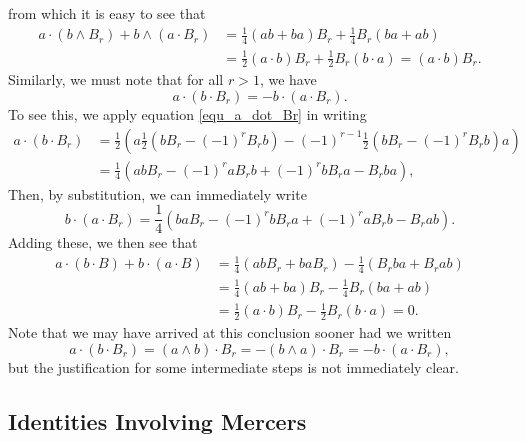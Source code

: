 \documentclass{birkjour}
\theoremstyle{definition}
\theoremstyle{remark}
\numberwithin{equation}{section}
\begin{document}
from which it is easy to see that
\begin{align*}
a\cdot(b\wedge B_r)+b\wedge(a\cdot B_r) &= \frac{1}{4}(ab+ba)B_r + \frac{1}{4}B_r(ba+ab) \\
 &= \frac{1}{2}(a\cdot b)B_r + \frac{1}{2}B_r(b\cdot a) = (a\cdot b)B_r.
\end{align*}
Similarly, we must note that for all $r>1$, we have
\begin{equation}\label{equ_a_dot_b_dot_Br_identity}
a\cdot(b\cdot B_r) = -b\cdot(a\cdot B_r).
\end{equation}
To see this, we apply equation \eqref{equ_a_dot_Br} in writing
\begin{align*}
a\cdot(b\cdot B_r)
 &= \frac{1}{2}\left(a\frac{1}{2}\left(bB_r-(-1)^rB_rb\right)-(-1)^{r-1}\frac{1}{2}\left(bB_r-(-1)^rB_rb\right)a\right) \\
 &= \frac{1}{4}\left(abB_r - (-1)^raB_rb + (-1)^rbB_ra - B_rba\right),
\end{align*}
Then, by substitution, we can immediately write
\begin{equation*}
b\cdot(a\cdot B_r) = \frac{1}{4}\left(baB_r - (-1)^rbB_ra + (-1)^raB_rb - B_rab\right).
\end{equation*}
Adding these, we then see that
\begin{align*}
a\cdot (b\cdot B)+b\cdot(a\cdot B)
 &= \frac{1}{4}\left(abB_r+baB_r\right)-\frac{1}{4}\left(B_rba+B_rab\right) \\
 &= \frac{1}{4}\left(ab+ba\right)B_r-\frac{1}{4}B_r\left(ba+ab\right) \\
 &= \frac{1}{2}(a\cdot b)B_r - \frac{1}{2}B_r(b\cdot a) = 0.
\end{align*}
Note that we may have arrived at this conclusion sooner had we written
\begin{equation*}
a\cdot(b\cdot B_r) = (a\wedge b)\cdot B_r = -(b\wedge a)\cdot B_r = -b\cdot(a\cdot B_r),
\end{equation*}
but the justification for some intermediate steps is not immediately clear.

\subsection{Identities Involving Mercers}
\end{document}
